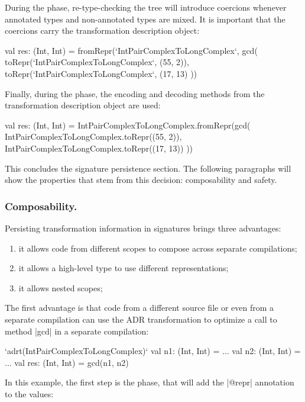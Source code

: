 During the \coerce{} phase, re-type-checking the tree will introduce coercions whenever annotated types and non-annotated types are mixed. It is important that the coercions carry the transformation description object:

\begin{lstlisting-nobreak}
val res: (Int, Int) =
  fromRepr(`IntPairComplexToLongComplex`, gcd(
    toRepr(`IntPairComplexToLongComplex`, (55, 2)),
    toRepr(`IntPairComplexToLongComplex`, (17, 13)
  ))
\end{lstlisting-nobreak}

Finally, during the \commit{} phase, the encoding and decoding methods from the transformation description object are used:

\begin{lstlisting-nobreak}
val res: (Int, Int) =
  IntPairComplexToLongComplex.fromRepr(gcd(
    IntPairComplexToLongComplex.toRepr((55, 2)),
    IntPairComplexToLongComplex.toRepr((17, 13))
  ))
\end{lstlisting-nobreak}

This concludes the signature persistence section. The following paragraphs will show the properties that stem from this decision: composability and safety.

\subsubsection{Composability. } Persisting transformation information in signatures brings three advantages:
\begin{enumerate}
  \item it allows code from different scopes to compose across separate compilations;
  \item it allows a high-level type to use different representations;
  \item it allows nested scopes;
\end{enumerate}

The first advantage is that code from a different source file or even from a separate compilation can use the ADR transformation to optimize a call to method |gcd| in a separate compilation:

\begin{lstlisting-nobreak}
`adrt(IntPairComplexToLongComplex)` {
  val n1: (Int, Int) = ...
  val n2: (Int, Int) = ...
  val res: (Int, Int) = gcd(n1, n2)
}
\end{lstlisting-nobreak}

In this example, the first step is the \inject{} phase, that will add the |@repr| annotation to the values:

